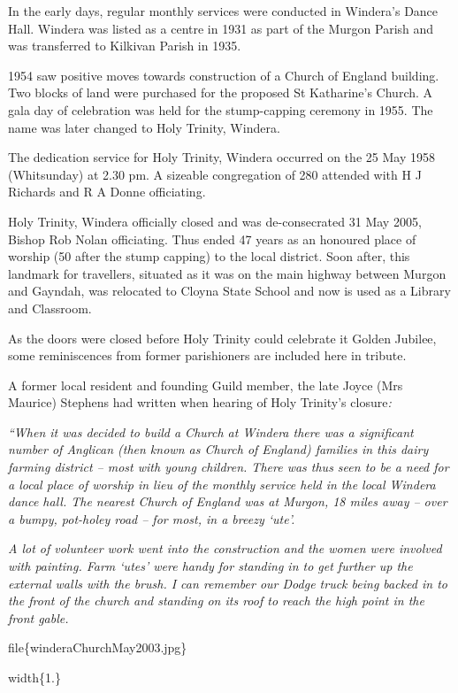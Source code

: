 In the early days, regular monthly services were conducted in Windera's Dance Hall. Windera was listed as a centre in 1931 as part of the Murgon Parish and was transferred to Kilkivan Parish in 1935.

1954 saw positive moves towards construction of a Church of England building. Two blocks of land were purchased for the proposed St Katharine's Church. A gala day of celebration was held for the stump-capping ceremony in 1955. The name was later changed to Holy Trinity, Windera.

The dedication service for Holy Trinity, Windera occurred on the 25 May 1958 (Whitsunday) at 2.30 pm. A sizeable congregation of 280 attended with H J Richards and R A Donne officiating.

Holy Trinity, Windera officially closed and was de-consecrated 31 May 2005, Bishop Rob Nolan officiating. Thus ended 47 years as an honoured place of worship (50 after the stump capping) to the local district. Soon after, this landmark for travellers, situated as it was on the main highway between Murgon and Gayndah, was relocated to Cloyna State School and now is used as a Library and Classroom.

As the doors were closed before Holy Trinity could celebrate it Golden Jubilee, some reminiscences from former parishioners are included here in tribute.

A former local resident and founding Guild member, the late Joyce (Mrs Maurice) Stephens had written when hearing of Holy Trinity's closure\emph{:}

\emph{``When it was decided to build a Church at Windera there was a significant number of Anglican (then known as Church of England) families in this dairy farming district -- most with young children. There was thus seen to be a need for a local place of worship in lieu of the monthly service held in the local Windera dance hall. The nearest Church of England was at Murgon, 18 miles away -- over a bumpy, pot-holey road -- for most, in a breezy `ute'.}

\emph{A lot of volunteer work went into the construction and the women were involved with painting. Farm `utes' were handy for standing in to get further up the external walls with the brush. I can remember our Dodge truck being backed in to the front of the church and standing on its roof to reach the high point in the front gable.}

file\{winderaChurchMay2003.jpg\}

width\{1.\}

